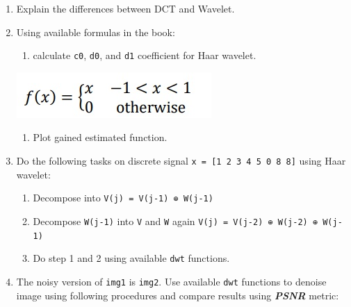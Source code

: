 \documentclass[11pt]{article}
\makeatletter
\def\maxwidth{\ifdim\Gin@nat@width>\linewidth\linewidth
    \else\Gin@nat@width\fi}
\let\Oldincludegraphics\includegraphics
\renewcommand{\includegraphics}[1]{\Oldincludegraphics[width=.8\maxwidth]{#1}}
\providecommand{\tightlist}{%
      \setlength{\itemsep}{0pt}\setlength{\parskip}{0pt}}
\makeatother
\begin{document}
\begin{enumerate}
\def\labelenumi{\arabic{enumi}.}
\tightlist
\item
  Explain the differences between DCT and Wavelet.
\item
  Using available formulas in the book:

  \begin{enumerate}
  \def\labelenumii{\arabic{enumii}.}
  \tightlist
  \item
    calculate \texttt{c0}, \texttt{d0}, and \texttt{d1} coefficient for
    Haar wavelet.
  \end{enumerate}

  \includegraphics{wiki/q2.jpg}

  \begin{enumerate}
  \def\labelenumii{\arabic{enumii}.}
  \setcounter{enumii}{1}
  \tightlist
  \item
    Plot gained estimated function.
  \end{enumerate}
\item
  Do the following tasks on discrete signal
  \texttt{x\ =\ {[}1\ 2\ 3\ 4\ 5\ 0\ 8\ 8{]}} using Haar wavelet:

  \begin{enumerate}
  \def\labelenumii{\arabic{enumii}.}
  \tightlist
  \item
    Decompose into \texttt{V(j)\ =\ V(j-1)\ ⊕\ W(j-1)}
  \item
    Decompose \texttt{W(j-1)} into \texttt{V} and \texttt{W} again
    \texttt{V(j)\ =\ V(j-2)\ ⊕\ W(j-2)\ ⊕\ W(j-1)}
  \item
    Do step 1 and 2 using available \texttt{dwt} functions.
  \end{enumerate}
\item
  The noisy version of \texttt{img1} is \texttt{img2}. Use available
  \texttt{dwt} functions to denoise image using following procedures and
  compare results using \emph{\textbf{PSNR}} metric:


\end{enumerate}
\end{document}
